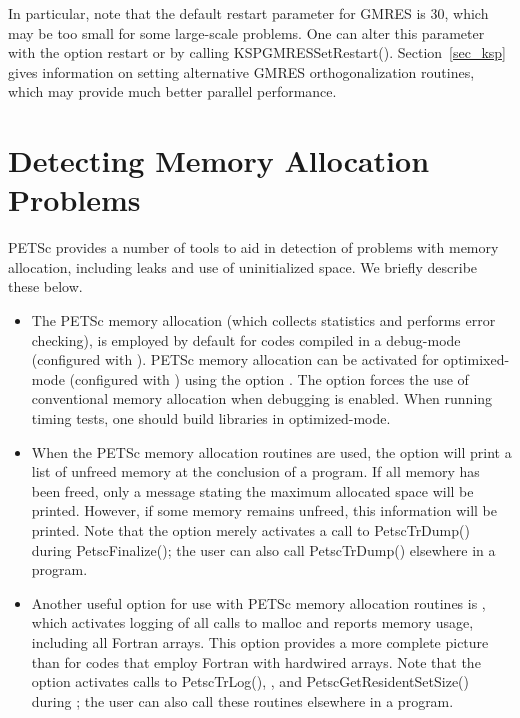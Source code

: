 {{In particular, note that the default restart parameter for GMRES is
30, which may be too small for some large-scale problems.  One can alter this
parameter with the option  \trl{<}restart\trl{>} or by
calling KSPGMRESSetRestart(). Section~\ref{sec_ksp} gives
information on setting alternative GMRES orthogonalization routines,
which may provide much better parallel performance.

\section{Detecting Memory Allocation Problems}

PETSc provides a number of tools to aid in detection of problems
with memory allocation, including leaks and use of uninitialized space.
We briefly describe these below.
 

\begin{itemize}

\item The PETSc memory allocation (which collects statistics and
performs error checking), is employed by default for codes compiled in
a debug-mode (configured with ).  PETSc memory
allocation can be activated for optimixed-mode (configured with
) using the option . The option
 forces the use of conventional memory allocation when
debugging is enabled.  When running timing tests, one should build
libraries in optimized-mode.

 
\item When the PETSc memory allocation routines are used, the option 
 will print a list of unfreed memory at the conclusion of a
program.  If all memory has been freed, only a message stating
the maximum allocated space will be printed.  However, if some memory
remains unfreed, this information will be printed.  Note that the
option  merely activates a call to PetscTrDump() during
PetscFinalize(); the user can also call PetscTrDump() elsewhere
in a program.

 
 
\item Another useful option for use with PETSc memory allocation
routines is , which activates logging of all calls
to malloc and reports memory usage, including all Fortran arrays.
This option provides a more complete picture than  for
codes that employ Fortran with hardwired arrays.  Note that the option
 activates calls to PetscTrLog(), , and PetscGetResidentSetSize() during ; the user can also call these routines elsewhere in a
program.


\end{itemize}}}
